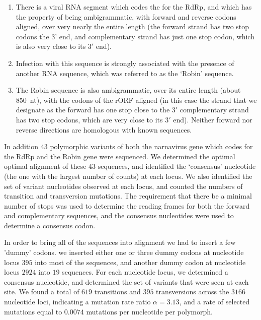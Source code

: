 \documentclass[unnumsec,webpdf,contemporary,large,namedate]{oup-authoring-template}%
\theoremstyle{thmstyleone}%
\theoremstyle{thmstyletwo}%
\theoremstyle{thmstylethree}%
\begin{document}
\begin{enumerate}

\item There is a viral RNA segment which codes the for the RdRp, and which has the 
property of being ambigrammatic, with forward and reverse codons aligned, over very nearly 
the entire length (the forward strand has two stop codons  the 3' end, and complementary strand 
has just one stop codon, which is also very close to its $3'$ end).  

\item Infection with this sequence is strongly associated with the presence of another RNA 
sequence, which was referred to  as the \lq Robin' sequence. 

\item The Robin sequence is also ambigrammatic, over  its entire length (about 850~nt), 
with the codons of the rORF aligned (in this case the strand that we designate as the forward  has one stop close to the $3'$  complementary strand 
has two stop codons, which are very close to its $3'$ end).  
Neither forward nor reverse directions  are homologous with known sequences.

\end{enumerate}

In addition $43$ polymorphic variants of both the narnavirus gene which codes for 
the RdRp and the Robin gene were sequenced. 
We determined the optimal optimal alignment of these $43$ sequences, and 
identified the \lq consensus' nucleotide (the one with the largest number of counts) at each locus.
We also identified the set of variant nucleotides observed at each locus, and counted the numbers
of transition and transversion mutations. The requirement that there be a minimal number of stops 
was used to determine the reading frames for both the forward and complementary sequences, and 
the consensus nucleotides were used to determine a consensus codon.
 
In order to bring all of the sequences into alignment we had to insert a few 'dummy' 
codons.  we inserted either one or three dummy codons at nucleotide locus $395$ into 
most of the sequences,  and another dummy codon at nucleotide locus $2924$ into $19$ sequences.
For each nucleotide locus, we determined a consensus nucleotide, and determined the set of variants 
that were seen at each site. We found a total of $619$ transitions and $395$ transversions across the $3166$
nucleotide loci, indicating a mutation rate ratio $\alpha=3.13$, and a rate of selected mutations equal to 
$0.0074$ mutations per nucleotide per polymorph.
\end{document}
